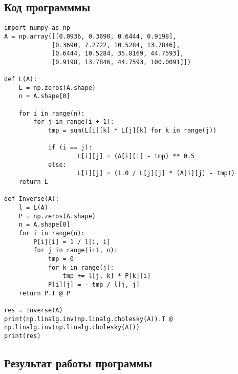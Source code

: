 \documentclass[12pt,a4paper]{article}
\begin{document}
\subsection{Код программмы}
\begin{verbatim}
import numpy as np
A = np.array([[0.0936, 0.3690, 0.6444, 0.9198],
             [0.3690, 7.2722, 10.5284, 13.7846],
             [0.6444, 10.5284, 35.8169, 44.7593],
             [0.9198, 13.7846, 44.7593, 100.0091]])

def L(A):
    L = np.zeros(A.shape)
    n = A.shape[0]

    for i in range(n):
        for j in range(i + 1):
            tmp = sum(L[i][k] * L[j][k] for k in range(j))

            if (i == j):
                    L[i][j] = (A[i][i] - tmp) ** 0.5
            else:
                    L[i][j] = (1.0 / L[j][j] * (A[i][j] - tmp))
    return L

def Inverse(A):
    l = L(A)
    P = np.zeros(A.shape)
    n = A.shape[0]
    for i in range(n):
        P[i][i] = 1 / l[i, i]
        for j in range(i+1, n):
            tmp = 0
            for k in range(j):
                tmp += l[j, k] * P[k][i]
            P[i][j] = - tmp / l[j, j]
    return P.T @ P

res = Inverse(A)
print(np.linalg.inv(np.linalg.cholesky(A)).T @ np.linalg.inv(np.linalg.cholesky(A)))
print(res)
\end{verbatim}
\subsection{Результат работы программы}
\end{document}
